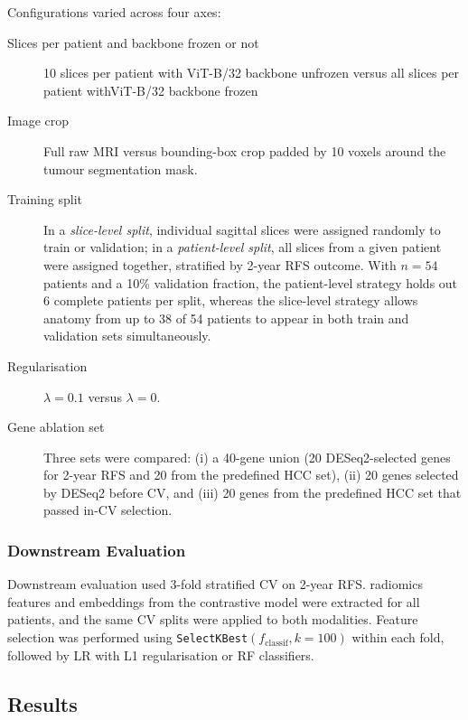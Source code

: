 \documentclass[12pt,twoside]{report}
\begin{document}
Configurations varied across four axes:
\begin{description}
  \item[Slices per patient and backbone frozen or not] 10 slices per patient with ViT-B/32 backbone unfrozen versus
    all slices per patient withViT-B/32 backbone frozen

  \item[Image crop] Full raw MRI versus bounding-box crop padded by 10 voxels around
    the tumour segmentation mask.

  \item[Training split] In a \textit{slice-level split}, individual sagittal slices were
    assigned randomly to train or validation; in a \textit{patient-level split}, all slices
    from a given patient were assigned together, stratified by 2-year RFS outcome.
    With $n=54$ patients and a 10\% validation fraction, the patient-level strategy holds out
    6 complete patients per split, whereas the slice-level strategy allows anatomy from up to
    38 of 54 patients to appear in both train and validation sets simultaneously.
  \item[Regularisation] $\lambda = 0.1$ versus $\lambda = 0$. 
  \item[Gene ablation set] Three sets were compared: (i) a 40-gene union (20 DESeq2-selected
    genes for 2-year RFS and 20 from the predefined HCC set), (ii) 20 genes selected by
    DESeq2 before CV, and (iii) 20 genes from the predefined HCC set that passed in-CV selection.

\end{description}

\subsubsection*{Downstream Evaluation}

Downstream evaluation used 3-fold stratified CV on 2-year RFS. 
radiomics features and embeddings from the contrastive model were extracted for all patients, and the same CV splits were applied to both modalities.
Feature selection was performed using \texttt{SelectKBest}$(f_\text{classif}, k=100)$ within each fold,
followed by LR with L1 regularisation or RF classifiers.

\subsection*{Results}
\end{document}
